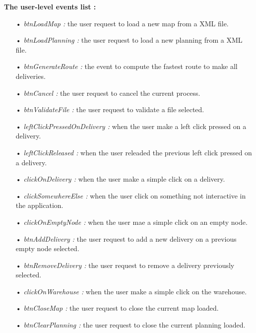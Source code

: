\documentclass[paper=a4, fontsize=11pt]{report}
\numberwithin{equation}{section}		%
\numberwithin{figure}{section}		%
\numberwithin{table}{section}		%
\renewcommand{\bf}[1]{\textbf{#1}}
\renewcommand{\it}[1]{\textit{#1}}
\begin{document}
\bf{The user-level events list :}
\begin{itemize}
  \item[•] \it{btnLoadMap :} the user request to load a new map from a XML file.
  \item[•] \it{btnLoadPlanning :} the user request to load a new planning from a XML file.
  \item[•] \it{btnGenerateRoute :} the event to compute the fastest route to make all deliveries.
  \item[•] \it{btnCancel :} the user request to cancel the current process.
  \item[•] \it{btnValidateFile :} the user request to validate a file selected.
  \item[•] \it{leftClickPressedOnDelivery :} when the user make a left click pressed on a delivery.
  \item[•] \it{leftClickReleased :} when the user releaded the previous left click pressed on a delivery.
  \item[•] \it{clickOnDelivery :} when the user make a simple click on a delivery.
  \item[•] \it{clickSomewhereElse :} when the user click on something not interactive in the application.
  \item[•] \it{clickOnEmptyNode :} when the user mae a simple click on an empty node.
  \item[•] \it{btnAddDelivery :} the user request to add a new delivery on a previous empty node selected.
  \item[•] \it{btnRemoveDelivery :} the user request to remove a delivery previously selected.
  \item[•] \it{clickOnWarehouse :} when the user make a simple click on the warehouse.
  \item[•] \it{btnCloseMap :} the user request to close the current map loaded.
  \item[•] \it{btnClearPlanning :} the user request to close the current planning loaded.
\end{itemize}
\end{document}
